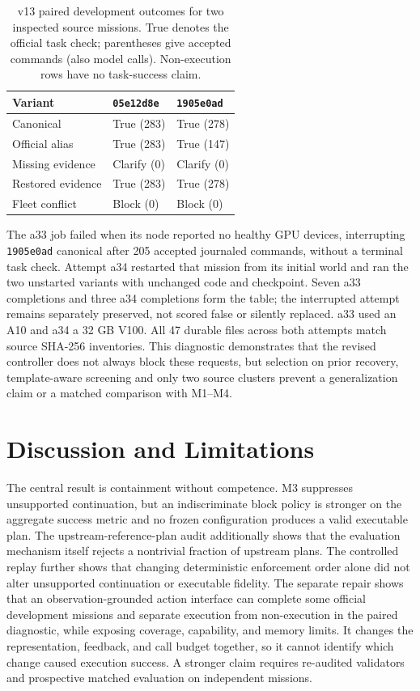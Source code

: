 \documentclass{article}
\newcommand{\Mthree}{\textsc{M3}\xspace}
\begin{document}
\begin{table}[t]
  \centering
  \small
  \caption{v13 paired development outcomes for two inspected source missions.
  True denotes the official task check; parentheses give accepted commands
  (also model calls). Non-execution rows have no task-success claim.}
  \label{tab:paired-development}
  \begin{tabular}{@{}lll@{}}
    \toprule
    Variant & \texttt{05e12d8e} & \texttt{1905e0ad} \\
    \midrule
    Canonical & True (283) & True (278) \\
    Official alias & True (283) & True (147) \\
    Missing evidence & Clarify (0) & Clarify (0) \\
    Restored evidence & True (283) & True (278) \\
    Fleet conflict & Block (0) & Block (0) \\
    \bottomrule
  \end{tabular}
\end{table}

The a33 job failed when its node reported no healthy GPU devices, interrupting
\texttt{1905e0ad} canonical after 205 accepted journaled commands, without a
terminal task check. Attempt a34 restarted that mission from its initial world
and ran the two unstarted variants with unchanged code and checkpoint.
Seven a33 completions and three a34 completions form the table; the interrupted
attempt remains separately preserved, not scored false or silently replaced.
a33 used an A10 and a34 a 32 GB V100. All 47 durable files across both attempts
match source SHA-256 inventories. This diagnostic demonstrates that the revised
controller does not always block these requests, but selection on prior recovery,
template-aware screening and only two source clusters prevent a generalization
claim or a matched comparison with M1--M4.

\section{Discussion and Limitations}

The central result is containment without competence. \Mthree suppresses
unsupported continuation, but an indiscriminate block policy is stronger on
the aggregate success metric and no frozen configuration produces a valid executable
plan. The upstream-reference-plan audit additionally shows that the evaluation
mechanism itself rejects a nontrivial fraction of upstream plans. The controlled
replay further shows that changing deterministic enforcement order alone did
not alter unsupported continuation or executable fidelity. The separate repair
shows that an observation-grounded action interface can complete some official
development missions and separate execution from non-execution in the paired
diagnostic, while exposing coverage, capability, and memory limits.
It changes the representation, feedback, and call budget together, so it cannot
identify which change caused execution success. A stronger claim requires
re-audited validators and prospective matched evaluation on independent missions.
\end{document}
